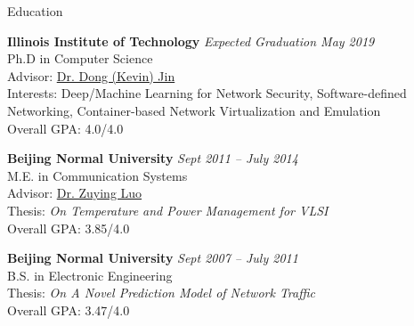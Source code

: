 \documentclass{resume} %
\begin{document}
\lastupdated


\begin{rSection}{Education}

{\bf Illinois Institute of Technology} \hfill {\em Expected Graduation May 2019} \\ 
Ph.D in Computer Science \\
Advisor: \href{http://cs.iit.edu/~djin/index.html}{Dr. Dong (Kevin) Jin} \\
Interests: Deep/Machine Learning for Network Security, Software-defined Networking, Container-based Network Virtualization and Emulation \\
Overall GPA: 4.0/4.0

{\bf Beijing Normal University} \hfill{\em Sept 2011 -- July 2014} \\
M.E. in Communication Systems\\
Advisor: \href{http://cist.bnu.edu.cn/xygk/szdw/zgj/552.html}{Dr. Zuying Luo} \\
Thesis: \emph{On Temperature and Power Management for VLSI} \\
Overall GPA: 3.85/4.0

{\bf Beijing Normal University} \hfill{\em Sept 2007 -- July 2011} \\
B.S. in Electronic Engineering\\
Thesis: \emph{On A Novel Prediction Model of Network Traffic} \\
Overall GPA: 3.47/4.0

\end{rSection}

\end{document}
